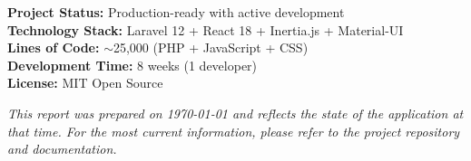 \vspace{0.5cm}

\noindent
\textbf{Project Status:} Production-ready with active development\\
\textbf{Technology Stack:} Laravel 12 + React 18 + Inertia.js + Material-UI\\
\textbf{Lines of Code:} $\sim$25,000 (PHP + JavaScript + CSS)\\
\textbf{Development Time:} 8 weeks (1 developer)\\
\textbf{License:} MIT Open Source

\vspace{0.5cm}

\noindent
\textit{This report was prepared on \today{} and reflects the state of the application at that time. For the most current information, please refer to the project repository and documentation.}
